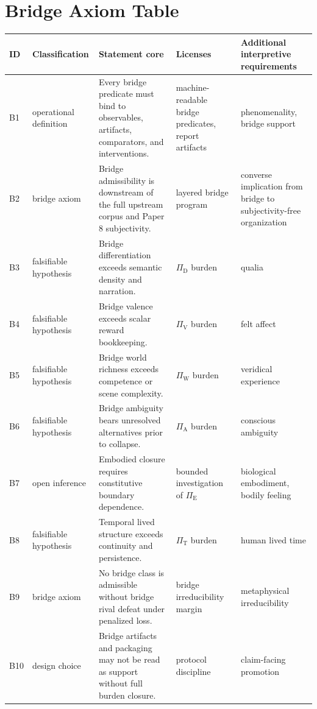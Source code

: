 \documentclass[11pt,a4paper]{article}
\theoremstyle{definition}
\newcommand{\PiD}{\Pi_{\mathrm{D}}}
\newcommand{\PiV}{\Pi_{\mathrm{V}}}
\newcommand{\PiW}{\Pi_{\mathrm{W}}}
\newcommand{\PiA}{\Pi_{\mathrm{A}}}
\newcommand{\PiE}{\Pi_{\mathrm{E}}}
\newcommand{\PiT}{\Pi_{\mathrm{T}}}
\begin{document}
\section{Bridge Axiom Table}
\begin{center}
\small
\begin{tabularx}{\linewidth}{@{}>{\raggedright\arraybackslash}p{}>{\raggedright\arraybackslash}p{}>{\raggedright\arraybackslash}p{}>{\raggedright\arraybackslash}p{}>{\raggedright\arraybackslash}p{}@{}}
\toprule
ID & Classification & Statement core & Licenses & Additional interpretive requirements \\
\midrule
B1 & operational definition & Every bridge predicate must bind to observables, artifacts, comparators, and interventions. & machine-readable bridge predicates, report artifacts & phenomenality, bridge support \\
B2 & bridge axiom & Bridge admissibility is downstream of the full upstream corpus and Paper 8 subjectivity. & layered bridge program & converse implication from bridge to subjectivity-free organization \\
B3 & falsifiable hypothesis & Bridge differentiation exceeds semantic density and narration. & $\PiD$ burden & qualia \\
B4 & falsifiable hypothesis & Bridge valence exceeds scalar reward bookkeeping. & $\PiV$ burden & felt affect \\
B5 & falsifiable hypothesis & Bridge world richness exceeds competence or scene complexity. & $\PiW$ burden & veridical experience \\
B6 & falsifiable hypothesis & Bridge ambiguity bears unresolved alternatives prior to collapse. & $\PiA$ burden & conscious ambiguity \\
B7 & open inference & Embodied closure requires constitutive boundary dependence. & bounded investigation of $\PiE$ & biological embodiment, bodily feeling \\
B8 & falsifiable hypothesis & Temporal lived structure exceeds continuity and persistence. & $\PiT$ burden & human lived time \\
B9 & bridge axiom & No bridge class is admissible without bridge rival defeat under penalized loss. & bridge irreducibility margin & metaphysical irreducibility \\
B10 & design choice & Bridge artifacts and packaging may not be read as support without full burden closure. & protocol discipline & claim-facing promotion \\
\bottomrule
\end{tabularx}
\end{center}
\end{document}
